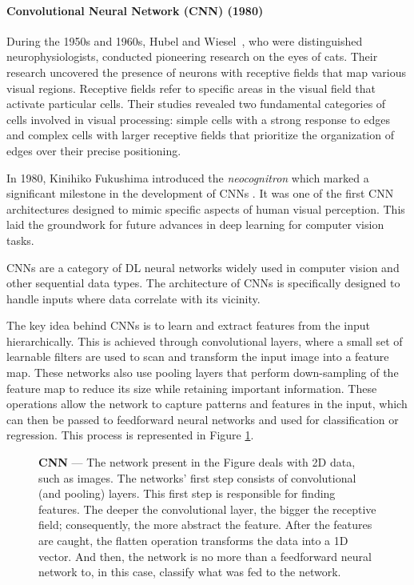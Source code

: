 \paragraph{Convolutional Neural Network (CNN) (1980)} \label{sec:CNN}

During the 1950s and 1960s, Hubel and Wiesel~\cite{hubel_receptive_1959}, who were distinguished neurophysiologists, conducted pioneering research on the eyes of cats. Their research uncovered the presence of neurons with receptive fields that map various visual regions. Receptive fields refer to specific areas in the visual field that activate particular cells. Their studies revealed two fundamental categories of cells involved in visual processing: simple cells with a strong response to edges and complex cells with larger receptive fields that prioritize the organization of edges over their precise positioning.

In 1980, Kinihiko Fukushima introduced the \textit{neocognitron} which marked a significant milestone in the development of \acp{CNN} \cite{fukushima_neocognitron_1980}. It was one of the first \ac{CNN} architectures designed to mimic specific aspects of human visual perception. This laid the groundwork for future advances in deep learning for computer vision tasks.

\Acp{CNN} are a category of \ac{DL} neural networks widely used in computer vision and other sequential data types. The architecture of \acp{CNN} is specifically designed to handle inputs where data correlate with its vicinity.

The key idea behind \acp{CNN} is to learn and extract features from the input hierarchically. This is achieved through convolutional layers, where a small set of learnable filters are used to scan and transform the input image into a feature map. These networks also use pooling layers that perform down-sampling of the feature map to reduce its size while retaining important information. These operations allow the network to capture patterns and features in the input, which can then be passed to feedforward neural networks and used for classification or regression. This process is represented in Figure \ref{fig:cnn}.

\begin{figure}[ht]
    \centering
    \caption[Convolutional Neural Network]{\textbf{\Acf{CNN}} --- The network present in the Figure deals with 2D data, such as images. The networks' first step consists of convolutional (and pooling) layers. This first step is responsible for finding features. The deeper the convolutional layer, the bigger the receptive field; consequently, the more abstract the feature. After the features are caught, the flatten operation transforms the data into a 1D vector. And then, the network is no more than a feedforward neural network to, in this case, classify what was fed to the network.}
    \label{fig:cnn}
\end{figure}

